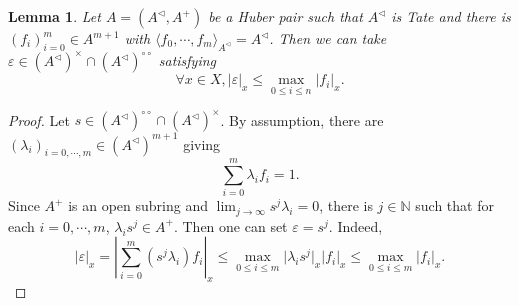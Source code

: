 \documentclass[8pt]{article}
\numberwithin{equation}{section}
\newtheorem{lemma}{Lemma}[subsection]
\DeclareMathOperator{\Spa}{Spa}
\newcommand{\N}[0]{\mathbb{N}}
\newcommand{\ab}[1]{\vert #1 \vert}
\newcommand{\dcirc}[0]{{\circ\circ}}
\begin{document}
\begin{lemma}
    \label{lemma_24_2}
    Let $A=(A^\triangleleft,A^+)$ be a Huber pair such that $A^\triangleleft$ is Tate and there is $(f_i)_{i=0}^m\in A^{m+1}$ with $\langle f_0,\cdots,f_m\rangle_{A^\triangleleft}=A^\triangleleft$. Then we can take $\varepsilon\in (A^{\triangleleft})^\times\cap (A^{\triangleleft})^\dcirc$ satisfying
    \begin{equation*}
        \forall x\in X,\ab{\varepsilon}_x \leq\max_{0\leq i\leq n}\ab{f_i}_x.\label{eq:lemma_24_2_3}
    \end{equation*}
\end{lemma}

\begin{proof}
    Let $s\in (A^{\triangleleft})^\dcirc\cap (A^{\triangleleft})^\times$. By assumption, there are $(\lambda_i)_{i=0,\cdots,m}\in (A^\triangleleft)^{m+1}$ giving
    \begin{equation*}
        \sum_{i=0}^m \lambda_i f_i = 1.
    \end{equation*}
    Since $A^+$ is an open subring and $\lim_{j\to\infty} s^j\lambda_i = 0$, there is $j\in\N$ such that for each $i=0,\cdots,m$, $\lambda_is^j\in A^+$. Then one can set $\varepsilon = s^j$. Indeed,
    \begin{equation*}
        \ab{\varepsilon}_x =\left\vert\sum_{i=0}^m (s^j\lambda_i)f_i\right\vert_x\leq\max_{0\leq i\leq m}\ab{\lambda_is^j}_x\ab{f_i}_x\leq \max_{0\leq i\leq m}\ab{f_i}_x.
    \end{equation*}
\end{proof}
\end{document}
